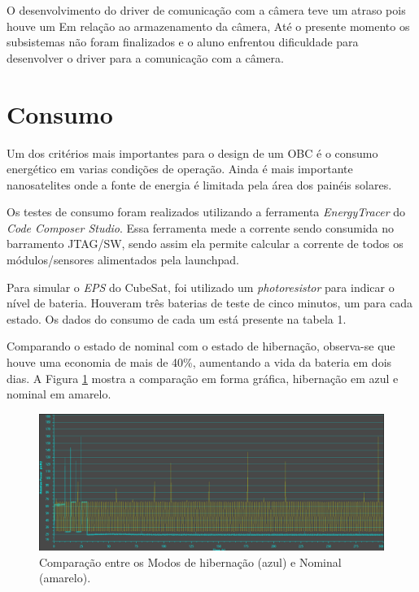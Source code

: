 O desenvolvimento do driver de comunicação com a câmera teve um atraso pois houve um Em relação ao armazenamento da câmera, Até o presente momento os subsistemas não foram finalizados e o aluno enfrentou dificuldade para desenvolver o driver para a comunicação com a câmera.

\section{Consumo}

Um dos critérios mais importantes para o design de um OBC é o consumo energético em varias condições de operação. Ainda é mais importante nanosatelites onde a fonte de energia é limitada pela área dos painéis solares. 

Os testes de consumo foram realizados utilizando a ferramenta \textit{EnergyTracer} do \textit{Code Composer Studio}. Essa ferramenta mede a corrente sendo consumida no barramento JTAG/SW, sendo assim ela permite calcular a corrente de todos os módulos/sensores alimentados pela launchpad. 

Para simular o \textit{EPS} do CubeSat, foi utilizado um \textit{photoresistor} para indicar o nível de bateria. Houveram três baterias de teste de cinco minutos, um para cada estado. Os dados do consumo de cada um está presente na tabela 1.

Comparando o estado de nominal com o estado de hibernação, observa-se que houve uma economia de mais de 40\%, aumentando a vida da bateria em dois dias. A Figura \ref{hibernatexNormal} mostra a comparação em forma gráfica, hibernação em azul e nominal em amarelo.

\begin{figure}[h]
	\centering
	\caption{Comparação entre os Modos de hibernação (azul) e Nominal (amarelo).}
	\includegraphics[keepaspectratio=true,scale=0.470]{figuras/hibernatexNormal.PNG}
	
	\label{hibernatexNormal}
\end{figure}

